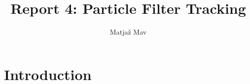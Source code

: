 \documentclass[runningheads]{llncs}
\begin{document}
% 
\title{Report 4: Particle Filter Tracking}
\author{Matjaž Mav}
%
\maketitle
%
 
\section{Introduction}
\end{document}

